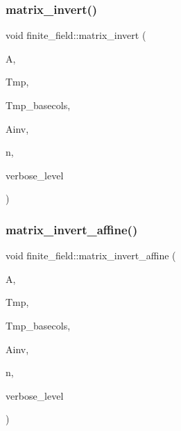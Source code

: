 \mbox{\label{classfinite__field_a4c017c0edc20fefef3da0db4ef4248f7}} 
\subsubsection{\texorpdfstring{matrix\+\_\+invert()}{matrix\_invert()}}
{\footnotesize\ttfamily void finite\+\_\+field\+::matrix\+\_\+invert (\begin{DoxyParamCaption}\item[{\mbox{\hyperlink{galois_8h_a09fddde158a3a20bd2dcadb609de11dc}{I\+NT}} $\ast$}]{A,  }\item[{\mbox{\hyperlink{galois_8h_a09fddde158a3a20bd2dcadb609de11dc}{I\+NT}} $\ast$}]{Tmp,  }\item[{\mbox{\hyperlink{galois_8h_a09fddde158a3a20bd2dcadb609de11dc}{I\+NT}} $\ast$}]{Tmp\+\_\+basecols,  }\item[{\mbox{\hyperlink{galois_8h_a09fddde158a3a20bd2dcadb609de11dc}{I\+NT}} $\ast$}]{Ainv,  }\item[{\mbox{\hyperlink{galois_8h_a09fddde158a3a20bd2dcadb609de11dc}{I\+NT}}}]{n,  }\item[{\mbox{\hyperlink{galois_8h_a09fddde158a3a20bd2dcadb609de11dc}{I\+NT}}}]{verbose\+\_\+level }\end{DoxyParamCaption})}

\mbox{\label{classfinite__field_a716c202ca9fcee1911e330f4a5bdba38}} 
\subsubsection{\texorpdfstring{matrix\+\_\+invert\+\_\+affine()}{matrix\_invert\_affine()}}
{\footnotesize\ttfamily void finite\+\_\+field\+::matrix\+\_\+invert\+\_\+affine (\begin{DoxyParamCaption}\item[{\mbox{\hyperlink{galois_8h_a09fddde158a3a20bd2dcadb609de11dc}{I\+NT}} $\ast$}]{A,  }\item[{\mbox{\hyperlink{galois_8h_a09fddde158a3a20bd2dcadb609de11dc}{I\+NT}} $\ast$}]{Tmp,  }\item[{\mbox{\hyperlink{galois_8h_a09fddde158a3a20bd2dcadb609de11dc}{I\+NT}} $\ast$}]{Tmp\+\_\+basecols,  }\item[{\mbox{\hyperlink{galois_8h_a09fddde158a3a20bd2dcadb609de11dc}{I\+NT}} $\ast$}]{Ainv,  }\item[{\mbox{\hyperlink{galois_8h_a09fddde158a3a20bd2dcadb609de11dc}{I\+NT}}}]{n,  }\item[{\mbox{\hyperlink{galois_8h_a09fddde158a3a20bd2dcadb609de11dc}{I\+NT}}}]{verbose\+\_\+level }\end{DoxyParamCaption})}

